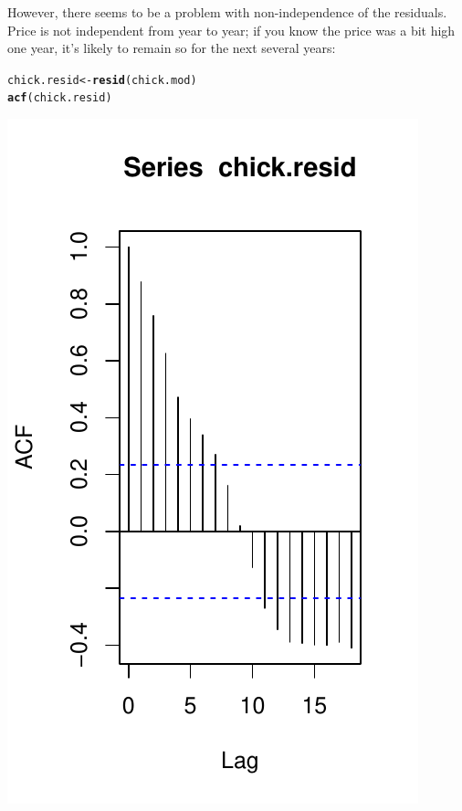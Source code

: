 \documentclass[twoside]{book}\usepackage[]{graphicx}\usepackage[]{xcolor}
\makeatletter
\def\maxwidth{ %
  \ifdim\Gin@nat@width>\linewidth
    \linewidth
  \else
    \Gin@nat@width
  \fi
}
\newcommand{\hlstd}[1]{\textcolor[rgb]{0.345,0.345,0.345}{#1}}%
\newcommand{\hlkwb}[1]{\textcolor[rgb]{0.69,0.353,0.396}{#1}}%
\newcommand{\hlkwd}[1]{\textcolor[rgb]{0.737,0.353,0.396}{\textbf{#1}}}%
\newenvironment{kframe}{%
 \def\at@end@of@kframe{}%
 \ifinner\ifhmode%
  \def\at@end@of@kframe{\end{minipage}}%
  \begin{minipage}{\columnwidth}%
 \fi\fi%
 \def\FrameCommand##1{\hskip\@totalleftmargin \hskip-\fboxsep
 \colorbox{shadecolor}{##1}\hskip-\fboxsep
     \hskip-\linewidth \hskip-\@totalleftmargin \hskip\columnwidth}%
 \MakeFramed {\advance\hsize-\width
   \@totalleftmargin\z@ \linewidth\hsize
   \@setminipage}}%
 {\par\unskip\endMakeFramed%
 \at@end@of@kframe}
\newenvironment{knitrout}{}{} %
\makeatother
\begin{document}
However, there seems to be a problem with non-independence of the residuals.  Price is not independent from year to year; if you know the price was a bit high one year, it's likely to remain so for the next several years:
\begin{knitrout}
\color{fgcolor}\begin{kframe}
\begin{alltt}
\hlstd{chick.resid} \hlkwb{<-} \hlkwd{resid}\hlstd{(chick.mod)}
\hlkwd{acf}\hlstd{(chick.resid)}
\end{alltt}
\end{kframe}

{\centering \includegraphics[width=\maxwidth]{figures/fig-chick_acf-1} 

}



\end{knitrout}
\end{document}
